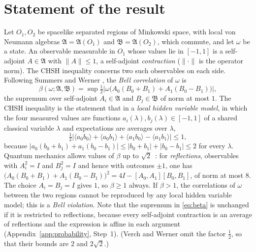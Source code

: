 \documentclass[aps,prl,reprint,longbibliography,raggedbottom]{revtex4-2}
\newcommand{\norm}[1]{\lVert #1\rVert}
\newcommand{\abs}[1]{\lvert #1\rvert}
\newcommand{\A}{\mathfrak A}
\newcommand{\B}{\mathfrak B}
\begin{document}
\section{Statement of the result}\label{sec:statement}

Let $O_1,O_2$ be spacelike separated regions of Minkowski space, with
local von Neumann algebras $\A=\A(O_1)$ and $\B=\A(O_2)$, which commute,
and let $\omega$ be a state. An observable measurable in $O_1$ whose
values lie in $[-1,1]$ is a self-adjoint $A\in\A$ with $\norm A\le1$,
a self-adjoint \emph{contraction} ($\norm\cdot$ is the operator norm).
The CHSH inequality \cite{CHSH69} concerns two such observables on each
side. Following Summers and Werner \cite{SW87a}, the \emph{Bell
correlation} of $\omega$ is
\begin{equation}
\beta(\omega;\A,\B)
=\sup\tfrac12\bigl\lvert\omega\bigl(A_0(B_0+B_1)+A_1(B_0-B_1)\bigr)\bigr\rvert,
\label{eq:beta}
\end{equation}
the supremum over self-adjoint $A_i\in\A$ and $B_j\in\B$ of norm at
most $1$. The CHSH inequality is the statement that in a \emph{local
hidden variable model}, in which the four measured values are
functions $a_i(\lambda),b_j(\lambda)\in[-1,1]$ of a shared classical
variable $\lambda$ and expectations are averages over $\lambda$,
\begin{equation}
\tfrac12\abs{\langle a_0b_0\rangle+\langle a_0b_1\rangle
+\langle a_1b_0\rangle-\langle a_1b_1\rangle}\le1 ,
\label{eq:CHSH}
\end{equation}
because $\abs{a_0(b_0+b_1)+a_1(b_0-b_1)}\le\abs{b_0+b_1}+\abs{b_0-b_1}\le2$
for every $\lambda$. Quantum mechanics allows values of $\beta$ up to $\sqrt2$~\cite{Tsirelson80}:
for \emph{reflections}, observables with $A_i^2=I$
and $B_j^2=I$ and hence with outcomes $\pm1$, one has
${\bigl(A_0(B_0+B_1)+A_1(B_0-B_1)\bigr)^2}=4I-[A_0,A_1][B_0,B_1]$, of norm
at most $8$. The choice $A_i=B_j=I$ gives $1$, so $\beta\ge1$ always.
If $\beta>1$, the correlations of $\omega$ between the two regions
cannot be reproduced by any local hidden variable model; this is a
\emph{Bell violation}. Note that the supremum in \eqref{eq:beta} is unchanged if
it is restricted to reflections, because every self-adjoint contraction is an
average of reflections and the expression is affine in each argument (Appendix~\ref{app:probability}, Step~1). (Verch and Werner
\cite{VW05} omit the factor $\frac12$, so that their bounds are $2$ and
$2\sqrt2$.)
\end{document}
